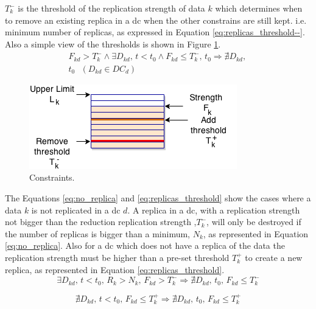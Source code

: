 \documentclass{acm_proc_article-sp}
\begin{document}
$T^{-}_{k}$ is the threshold of the replication strength of data $k$ which determines when to remove an existing replica in a \gls{dc} when the other constrains are still kept. i.e. minimum number of replicas, as expressed in Equation \ref{eq:replicas_threshold--}. Also a simple view of the thresholds is shown in Figure \ref{fig:lim_constriants}.
\begin{equation} \label{eq:replicas_threshold--}
	\begin{split}
		F_{kd} > T^{-}_{k} \wedge \exists D_{kd} \text{, } t < t_{0}  \wedge F_{kd} \le T^{-}_{k} \text{, } t_{0} \Longrightarrow \nexists D_{kd} \text{, }\\
		 t_{0} \text{ } (D_{kd} \in DC_{d})
	\end{split}
\end{equation}
\begin{center}
	\begin{figure}[ht!]
		\centering
		\includegraphics[width=.51\textwidth]{figures/strengthReplica.png}
	
		\caption{Constraints.}
		\label{fig:lim_constriants}
	\end{figure}
\end{center}

The Equations \ref{eq:no_replica} and \ref{eq:replicas_threshold} show the cases where a data $k$ is not replicated in a \gls{dc} $d$.  A replica in a \gls{dc}, with a replication strength not bigger than the reduction replication strength ,$T^{-}_{k}$, will only be destroyed if the number of replicas is bigger than a minimum, $N_{k}$, as represented in Equation \ref{eq:no_replica}. Also for a \gls{dc} which does not have a replica of the data the replication strength must be higher than a pre-set threshold $T^{+}_{k}$ to create a new replica, as represented in Equation \ref{eq:replicas_threshold}.
\begin{equation} \label{eq:no_replica}
	\exists D_{kd} \text{, } t < t_{0} \text{, } R_{k} > N_{k} \text{, } F_{kd} > T^{-}_{k} \Longrightarrow \nexists D_{kd} \text{, } t_{0} \text{, } F_{kd} \le T^{-}_{k}
\end{equation}

\begin{equation} \label{eq:replicas_threshold}
	\nexists D_{kd} \text{, } t < t_{0} \text{, } F_{kd} \le T^{+}_{k} \Longrightarrow \nexists D_{kd} \text{, } t_{0} \text{, } F_{kd} \le T^{+}_{k}
\end{equation}
\end{document}
